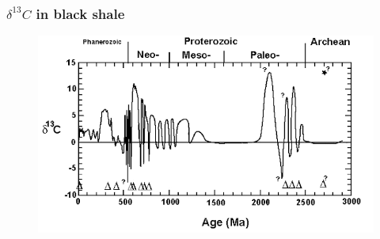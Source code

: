 \documentclass{beamer}
\begin{document}
        \begin{frame}
        \frametitle{$\delta^{13} C$ in black shale}
        \begin{figure}
        \begin{center}
                \includegraphics[width=\textwidth]{shale_carbon.png}
        \end{center}
        \end{figure}
        \end{frame}
        
\end{document}
